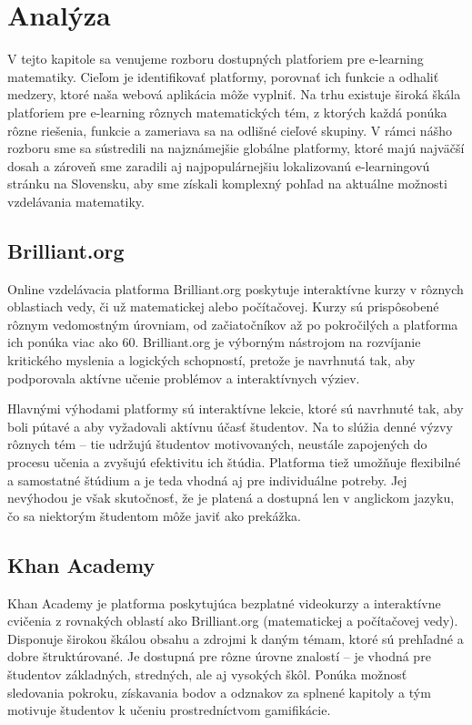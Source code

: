 \section{Analýza}
V tejto kapitole sa venujeme rozboru dostupných platforiem pre e-learning matematiky. 
Cieľom je identifikovať platformy, porovnať ich funkcie a odhaliť medzery, ktoré naša webová aplikácia môže vyplniť. 
Na trhu existuje široká škála platforiem pre e-learning rôznych matematických tém, 
z ktorých každá ponúka rôzne riešenia, funkcie a zameriava sa na odlišné cieľové skupiny.
V rámci nášho rozboru sme sa sústredili na najznámejšie globálne platformy, ktoré majú najväčší dosah a zároveň sme zaradili aj najpopulárnejšiu lokalizovanú e-learningovú stránku na Slovensku, aby sme získali komplexný pohľad na aktuálne možnosti vzdelávania matematiky.
\subsection{Brilliant.org}
Online vzdelávacia platforma Brilliant.org poskytuje interaktívne kurzy v rôznych oblastiach vedy, či už matematickej alebo počítačovej.
 Kurzy sú prispôsobené rôznym vedomostným úrovniam, od začiatočníkov až po pokročilých a platforma ich ponúka viac ako 60.
 Brilliant.org je výborným nástrojom na rozvíjanie kritického myslenia a logických schopností, pretože je navrhnutá tak, aby podporovala aktívne učenie problémov a interaktívnych výziev.

 Hlavnými výhodami platformy sú interaktívne lekcie, ktoré sú navrhnuté tak, aby boli pútavé a aby vyžadovali aktívnu účasť študentov.
  Na to slúžia denné výzvy rôznych tém – tie udržujú študentov motivovaných, neustále zapojených do procesu učenia a zvyšujú efektivitu ich štúdia.
   Platforma tiež umožňuje flexibilné a  samostatné štúdium a je teda vhodná aj pre individuálne potreby.
  Jej nevýhodou je však skutočnosť, že je platená a dostupná len v anglickom jazyku, čo sa niektorým študentom môže javiť ako prekážka.\cite{brilliant}
\subsection{Khan Academy}
Khan Academy je platforma poskytujúca bezplatné videokurzy a interaktívne cvičenia z rovnakých oblastí ako Brilliant.org (matematickej a počítačovej vedy).
 Disponuje širokou škálou obsahu a zdrojmi k daným témam, ktoré sú prehľadné a dobre štruktúrované. Je dostupná pre rôzne úrovne znalostí – je vhodná pre študentov základných, stredných, ale aj vysokých škôl.
 Ponúka možnosť sledovania pokroku, získavania bodov a odznakov za splnené kapitoly a tým motivuje študentov k učeniu prostredníctvom gamifikácie.

